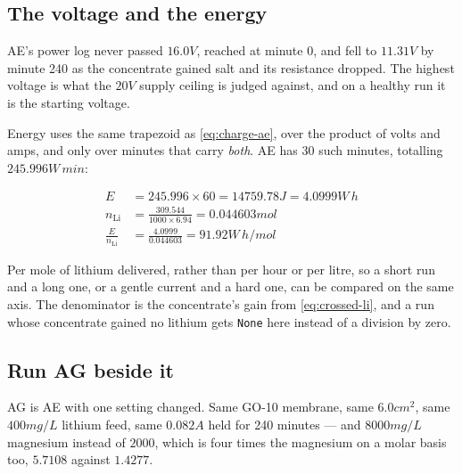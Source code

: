 \subsection{The voltage and the energy}

AE's power log never passed $16.0\unit{V}$, reached at minute 0, and fell to
$11.31\unit{V}$ by minute 240 as the concentrate gained salt and its resistance dropped. The
highest voltage is what the $20\unit{V}$ supply ceiling is judged against, and on a healthy
run it is the starting voltage.

Energy uses the same trapezoid as \eqref{eq:charge-ae}, over the product of volts and amps, and
only over minutes that carry \emph{both}. AE has 30 such minutes, totalling
$245.996\unit{W\,min}$:

\begin{align}
E &= 245.996 \times 60 = 14759.78\unit{J} = 4.0999\unit{W\,h} \label{eq:energy-ae} \\
n_{\mathrm{Li}} &= \frac{309.544}{1000 \times 6.94} = 0.044603\unit{mol} \nonumber \\
\frac{E}{n_{\mathrm{Li}}} &= \frac{4.0999}{0.044603} = 91.92\unit{W\,h/mol} \nonumber
\end{align}

Per mole of lithium delivered, rather than per hour or per litre, so a short run and a long
one, or a gentle current and a hard one, can be compared on the same axis. The denominator is
the concentrate's gain from \eqref{eq:crossed-li}, and a run whose concentrate gained no
lithium gets \texttt{None} here instead of a division by zero.

\subsection{Run AG beside it}

AG is AE with one setting changed. Same GO-10 membrane, same $6.0\unit{cm^2}$, same
$400\unit{mg/L}$ lithium feed, same $0.082\unit{A}$ held for 240 minutes --- and
$8000\unit{mg/L}$ magnesium instead of $2000$, which is four times the magnesium on a molar
basis too, $5.7108$ against $1.4277$.

